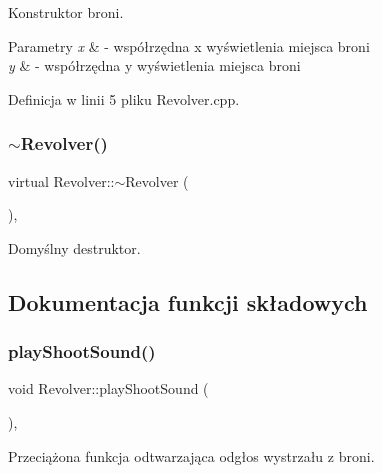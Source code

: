 Konstruktor broni. 


\begin{DoxyParams}{Parametry}
{\em x} & -\/ współrzędna x wyświetlenia miejsca broni \\
\hline
{\em y} & -\/ współrzędna y wyświetlenia miejsca broni \\
\hline
\end{DoxyParams}


Definicja w linii 5 pliku Revolver.\+cpp.

\mbox{\label{class_revolver_a989391a89ed1babecbc7360d670f3bc8}} 
\subsubsection{\texorpdfstring{$\sim$\+Revolver()}{~Revolver()}}
{\footnotesize\ttfamily virtual Revolver\+::$\sim$\+Revolver (\begin{DoxyParamCaption}{ }\end{DoxyParamCaption})\hspace{0.3cm}{\ttfamily [virtual]}, {\ttfamily [default]}}



Domyślny destruktor. 



\subsection{Dokumentacja funkcji składowych}
\mbox{\label{class_revolver_acc5cf142969078c7ee588582cd7c9316}} 
\subsubsection{\texorpdfstring{play\+Shoot\+Sound()}{playShootSound()}}
{\footnotesize\ttfamily void Revolver\+::play\+Shoot\+Sound (\begin{DoxyParamCaption}{ }\end{DoxyParamCaption})\hspace{0.3cm}{\ttfamily [override]}, {\ttfamily [virtual]}}



Przeciążona funkcja odtwarzająca odgłos wystrzału z broni. 



